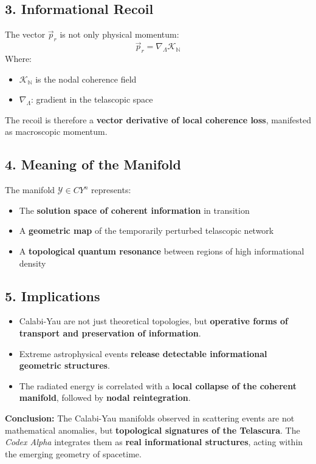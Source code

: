 \documentclass[12pt]{article}
\begin{document}
\subsection*{3. Informational Recoil}
The vector $\vec{p}_r$ is not only physical momentum:
\[
\vec{p}_r = \nabla_{\Lambda} \mathcal{K}_{\mathbb{N}}
\]
Where:
\begin{itemize}
    \item $\mathcal{K}_{\mathbb{N}}$ is the nodal coherence field
    \item $\nabla_{\Lambda}$: gradient in the telascopic space
\end{itemize}

The recoil is therefore a \textbf{vector derivative of local coherence loss}, manifested as macroscopic momentum.

\subsection*{4. Meaning of the Manifold}
The manifold $\mathcal{Y} \in CY^n$ represents:
\begin{itemize}
    \item The \textbf{solution space of coherent information} in transition
    \item A \textbf{geometric map} of the temporarily perturbed telascopic network
    \item A \textbf{topological quantum resonance} between regions of high informational density
\end{itemize}

\subsection*{5. Implications}
\begin{itemize}
    \item Calabi-Yau are not just theoretical topologies, but \textbf{operative forms of transport and preservation of information}.
    \item Extreme astrophysical events \textbf{release detectable informational geometric structures}.
    \item The radiated energy is correlated with a \textbf{local collapse of the coherent manifold}, followed by \textbf{nodal reintegration}.
\end{itemize}

\textbf{Conclusion:} The Calabi-Yau manifolds observed in scattering events are not mathematical anomalies, but \textbf{topological signatures of the Telascura}. The \textit{Codex Alpha} integrates them as \textbf{real informational structures}, acting within the emerging geometry of spacetime.
\end{document}
